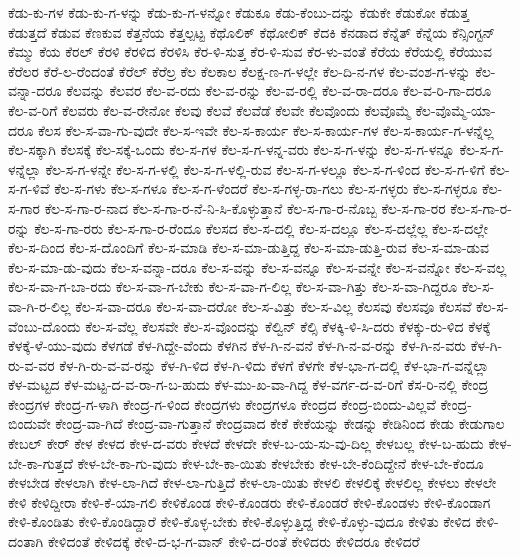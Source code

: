 {ಕೆಡು-ಕು-ಗಳ
ಕೆಡು-ಕು-ಗ-ಳನ್ನು
ಕೆಡು-ಕು-ಗ-ಳನ್ನೋ
ಕೆಡುಕೂ
ಕೆಡು-ಕೆಂಬು-ದನ್ನು
ಕೆಡುಕೇ
ಕೆಡುಕೋ
ಕೆಡುತ್ತ
ಕೆಡುತ್ತದೆ
ಕೆಡುವ
ಕೆಣಕುವ
ಕೆತ್ತನೆಯ
ಕೆತ್ತಲ್ಪಟ್ಟ
ಕೆಥೊಲಿಕ್
ಕೆಥೋಲಿಕ್
ಕೆದಕಿ
ಕೆನಡಾದ
ಕೆನ್ನೆತ್
ಕೆನ್ನೆಯ
ಕೆನ್ಸಿಂಗ್ಟನ್
ಕೆಮ್ಮು
ಕೆಯ
ಕೆರಲ್
ಕೆರಳಿ
ಕೆರಳಿದ
ಕೆರಳಿಸಿ
ಕೆರ-ಳಿ-ಸುತ್ತ
ಕೆರ-ಳಿ-ಸುವ
ಕೆರ-ಳು-ವಂತೆ
ಕೆರೆಯ
ಕೆರೆಯಲ್ಲಿ
ಕೆರೆಯುವ
ಕೆರೆಲರ
ಕೆರೆ-ಲ-ರೆಂದಂತೆ
ಕೆರೆಲ್
ಕೆರೆಲ್ರ
ಕೆಲ
ಕೆಲಕಾಲ
ಕೆಲಕ್ಷ-ಣ-ಗ-ಳಲ್ಲೇ
ಕೆಲ-ದಿ-ನ-ಗಳ
ಕೆಲ-ವಂಶ-ಗ-ಳನ್ನು
ಕೆಲ-ವನ್ನಾ-ದರೂ
ಕೆಲವನ್ನು
ಕೆಲವರ
ಕೆಲ-ವ-ರದು
ಕೆಲ-ವ-ರನ್ನು
ಕೆಲ-ವ-ರಲ್ಲಿ
ಕೆಲ-ವ-ರಾ-ದರೂ
ಕೆಲ-ವ-ರಿ-ಗಾ-ದರೂ
ಕೆಲ-ವ-ರಿಗೆ
ಕೆಲವರು
ಕೆಲ-ವ-ರೇನೋ
ಕೆಲವು
ಕೆಲವೆ
ಕೆಲವೆಡೆ
ಕೆಲವೇ
ಕೆಲವೊಂದು
ಕೆಲವೊಮ್ಮೆ
ಕೆಲ-ವೊಮ್ಮೆ-ಯಾ-ದರೂ
ಕೆಲಸ
ಕೆಲ-ಸ-ವಾ-ಗು-ವುದೇ
ಕೆಲ-ಸ-ಇವೇ
ಕೆಲ-ಸ-ಕಾರ್ಯ
ಕೆಲ-ಸ-ಕಾರ್ಯ-ಗಳ
ಕೆಲ-ಸ-ಕಾರ್ಯ-ಗ-ಳನ್ನೆಲ್ಲ
ಕೆಲ-ಸಕ್ಕಾಗಿ
ಕೆಲಸಕ್ಕೆ
ಕೆಲ-ಸಕ್ಕೆ-ಒಂದು
ಕೆಲ-ಸ-ಗಳ
ಕೆಲ-ಸ-ಗ-ಳನ್ನ-ವರು
ಕೆಲ-ಸ-ಗ-ಳನ್ನು
ಕೆಲ-ಸ-ಗ-ಳನ್ನೂ
ಕೆಲ-ಸ-ಗ-ಳನ್ನೆಲ್ಲಾ
ಕೆಲ-ಸ-ಗ-ಳನ್ನೇ
ಕೆಲ-ಸ-ಗ-ಳಲ್ಲಿ
ಕೆಲ-ಸ-ಗ-ಳಲ್ಲಿ-ರುವ
ಕೆಲ-ಸ-ಗ-ಳಲ್ಲೂ
ಕೆಲ-ಸ-ಗ-ಳಿಂದ
ಕೆಲ-ಸ-ಗ-ಳಿಗೆ
ಕೆಲ-ಸ-ಗ-ಳಿವೆ
ಕೆಲ-ಸ-ಗಳು
ಕೆಲ-ಸ-ಗಳೂ
ಕೆಲ-ಸ-ಗ-ಳೆಂದರೆ
ಕೆಲ-ಸ-ಗಳ್ಳ-ರಾ-ಗಲು
ಕೆಲ-ಸ-ಗಳ್ಳರು
ಕೆಲ-ಸ-ಗಳ್ಳರೂ
ಕೆಲ-ಸ-ಗಾರ
ಕೆಲ-ಸ-ಗಾ-ರ-ನಾದ
ಕೆಲ-ಸ-ಗಾ-ರ-ನೆ-ನಿ-ಸಿ-ಕೊಳ್ಳುತ್ತಾನೆ
ಕೆಲ-ಸ-ಗಾ-ರ-ನೊಬ್ಬ
ಕೆಲ-ಸ-ಗಾ-ರರ
ಕೆಲ-ಸ-ಗಾ-ರ-ರನ್ನು
ಕೆಲ-ಸ-ಗಾ-ರರು
ಕೆಲ-ಸ-ಗಾ-ರ-ರೆಂದೂ
ಕೆಲಸದ
ಕೆಲ-ಸ-ದಲ್ಲಿ
ಕೆಲ-ಸ-ದಲ್ಲೂ
ಕೆಲ-ಸ-ದಲ್ಲೆಲ್ಲ
ಕೆಲ-ಸ-ದಲ್ಲೇ
ಕೆಲ-ಸ-ದಿಂದ
ಕೆಲ-ಸ-ದೊಂದಿಗೆ
ಕೆಲ-ಸ-ಮಾಡಿ
ಕೆಲ-ಸ-ಮಾ-ಡುತ್ತಿದ್ದ
ಕೆಲ-ಸ-ಮಾ-ಡುತ್ತಿ-ರುವ
ಕೆಲ-ಸ-ಮಾ-ಡುವ
ಕೆಲ-ಸ-ಮಾ-ಡು-ವುದು
ಕೆಲ-ಸ-ವನ್ನಾ-ದರೂ
ಕೆಲ-ಸ-ವನ್ನು
ಕೆಲ-ಸ-ವನ್ನೂ
ಕೆಲ-ಸ-ವನ್ನೇ
ಕೆಲ-ಸ-ವನ್ನೋ
ಕೆಲ-ಸ-ವಲ್ಲ
ಕೆಲ-ಸ-ವಾ-ಗ-ಬಾ-ರದು
ಕೆಲ-ಸ-ವಾ-ಗ-ಬೇಕು
ಕೆಲ-ಸ-ವಾ-ಗ-ಲಿಲ್ಲ
ಕೆಲ-ಸ-ವಾ-ಗಿತ್ತು
ಕೆಲ-ಸ-ವಾ-ಗಿದ್ದರೂ
ಕೆಲ-ಸ-ವಾ-ಗಿ-ರ-ಲಿಲ್ಲ
ಕೆಲ-ಸ-ವಾ-ದರೂ
ಕೆಲ-ಸ-ವಾ-ದರೋ
ಕೆಲ-ಸ-ವಿತ್ತು
ಕೆಲ-ಸ-ವಿಲ್ಲ
ಕೆಲಸವು
ಕೆಲಸವೂ
ಕೆಲಸವೆ
ಕೆಲ-ಸ-ವೆಂಬು-ದೊಂದು
ಕೆಲ-ಸ-ವೆಲ್ಲ
ಕೆಲಸವೇ
ಕೆಲ-ಸ-ವೊಂದನ್ನು
ಕೆಲ್ವಿನ್
ಕೆಲ್ಸಿ
ಕೆಳಕ್ಕಿ-ಳಿ-ಸಿ-ದರು
ಕೆಳಕ್ಕು-ರು-ಳಿದ
ಕೆಳಕ್ಕೆ
ಕೆಳಕ್ಕೆ-ಳೆ-ಯು-ವುದು
ಕೆಳಗಡೆ
ಕೆಳ-ಗಿದ್ದೇ-ವೆಂದು
ಕೆಳಗಿನ
ಕೆಳ-ಗಿ-ನ-ವನೆ
ಕೆಳ-ಗಿ-ನ-ವ-ರನ್ನು
ಕೆಳ-ಗಿ-ನ-ವರು
ಕೆಳ-ಗಿ-ರು-ವ-ವರ
ಕೆಳ-ಗಿ-ರು-ವ-ವ-ರನ್ನು
ಕೆಳ-ಗಿ-ಳಿದ
ಕೆಳ-ಗಿ-ಳಿದು
ಕೆಳಗೆ
ಕೆಳಗೇ
ಕೆಳ-ಭಾ-ಗ-ದಲ್ಲಿ
ಕೆಳ-ಭಾ-ಗ-ವನ್ನೆಲ್ಲಾ
ಕೆಳ-ಮಟ್ಟದ
ಕೆಳ-ಮಟ್ಟ-ದ-ವ-ರಾ-ಗ-ಬ-ಹುದು
ಕೆಳ-ಮು-ಖ-ವಾ-ಗಿದ್ದ
ಕೆಳ-ವರ್ಗ-ದ-ವ-ರಿಗೆ
ಕೆಸ-ರಿ-ನಲ್ಲಿ
ಕೇಂದ್ರ
ಕೇಂದ್ರಗಳ
ಕೇಂದ್ರ-ಗ-ಳಾಗಿ
ಕೇಂದ್ರ-ಗ-ಳಿಂದ
ಕೇಂದ್ರಗಳು
ಕೇಂದ್ರಗಳೂ
ಕೇಂದ್ರದ
ಕೇಂದ್ರ-ಬಿಂದು-ವಿಲ್ಲವೆ
ಕೇಂದ್ರ-ಬಿಂದುವೇ
ಕೇಂದ್ರ-ವಾ-ಗಿದೆ
ಕೇಂದ್ರ-ವಾ-ಗುತ್ತಾನೆ
ಕೇಂದ್ರವಾದ
ಕೇಕೆ
ಕೇಕೆಯನ್ನು
ಕೇಡನ್ನು
ಕೇಡಿನಿಂದ
ಕೇಡು
ಕೇಡುಗಾಲ
ಕೇಬಲ್
ಕೇರ್
ಕೇಳ
ಕೇಳದ
ಕೇಳ-ದ-ವರು
ಕೇಳದೆ
ಕೇಳದೇ
ಕೇಳ-ಬ-ಯ-ಸು-ವು-ದಿಲ್ಲ
ಕೇಳಬಲ್ಲ
ಕೇಳ-ಬ-ಹುದು
ಕೇಳ-ಬೇ-ಕಾ-ಗುತ್ತದೆ
ಕೇಳ-ಬೇ-ಕಾ-ಗು-ವುದು
ಕೇಳ-ಬೇ-ಕಾ-ಯಿತು
ಕೇಳಬೇಕು
ಕೇಳ-ಬೇ-ಕೆಂದಿದ್ದೇನೆ
ಕೇಳ-ಬೇ-ಕೆಂದೂ
ಕೇಳಬೇಡ
ಕೇಳಲಾಗಿ
ಕೇಳ-ಲಾ-ಗಿದೆ
ಕೇಳ-ಲಾ-ಗುತ್ತಿದೆ
ಕೇಳ-ಲಾ-ಯಿತು
ಕೇಳಲಿ
ಕೇಳಲಿಕ್ಕೆ
ಕೇಳಲಿಲ್ಲ
ಕೇಳಲು
ಕೇಳಲೇ
ಕೇಳಿ
ಕೇಳಿದ್ದೀರಾ
ಕೇಳಿ-ಕೆ-ಯಾ-ಗಲಿ
ಕೇಳಿಕೊಂಡ
ಕೇಳಿ-ಕೊಂಡರು
ಕೇಳಿ-ಕೊಂಡರೆ
ಕೇಳಿ-ಕೊಂಡಳು
ಕೇಳಿ-ಕೊಂಡಾಗ
ಕೇಳಿ-ಕೊಂಡಿತು
ಕೇಳಿ-ಕೊಂಡಿದ್ದಾರೆ
ಕೇಳಿ-ಕೊಳ್ಳ-ಬೇಕು
ಕೇಳಿ-ಕೊಳ್ಳುತ್ತಿದ್ದ
ಕೇಳಿ-ಕೊಳ್ಳು-ವುದೂ
ಕೇಳಿತು
ಕೇಳಿದ
ಕೇಳಿ-ದಂತಾಗಿ
ಕೇಳಿದಂತೆ
ಕೇಳಿದಕ್ಕೆ
ಕೇಳಿ-ದ-ಭ-ಗ-ವಾನ್
ಕೇಳಿ-ದ-ರಂತೆ
ಕೇಳಿದರು
ಕೇಳಿದರೂ
ಕೇಳಿದರೆ
}
